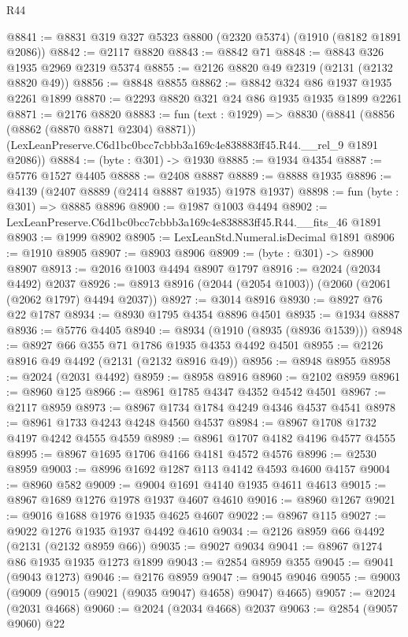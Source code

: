 \begin{lexlean}{R44}
\begin{coremodule}
@8841 := @8831 @319 @327 @5323 @8800 (@2320 @5374) (@1910 (@8182 @1891 @2086))
@8842 := @2117 @8820
@8843 := @8842 @71
@8848 := @8843 @326 @1935 @2969 @2319 @5374
@8855 := @2126 @8820 @49 @2319 (@2131 (@2132 @8820 @49))
@8856 := @8848 @8855
@8862 := @8842 @324 @86 @1937 @1935 @2261 @1899
@8870 := @2293 @8820 @321 @24 @86 @1935 @1935 @1899 @2261
@8871 := @2176 @8820
@8883 := fun (text : @1929) =>
  @8830
    (@8841
      (@8856 (@8862 (@8870 @8871 @2304) @8871))
      (LexLeanPreserve.C6d1bc0bcc7cbbb3a169c4e838883ff45.R44.__rel_9 @1891 @2086))
@8884 := (byte : @301) -> @1930
@8885 := @1934 @4354
@8887 := @5776 @1527 @4405
@8888 := @2408 @8887
@8889 := @8888 @1935
@8896 := @4139 (@2407 @8889 (@2414 @8887 @1935) @1978 @1937)
@8898 := fun (byte : @301) => @8885 @8896
@8900 := @1987 @1003 @4494
@8902 := LexLeanPreserve.C6d1bc0bcc7cbbb3a169c4e838883ff45.R44.__fits_46 @1891
@8903 := @1999 @8902
@8905 := LexLeanStd.Numeral.isDecimal @1891
@8906 := @1910 @8905
@8907 := @8903 @8906
@8909 := (byte : @301) -> @8900 @8907
@8913 := @2016 @1003 @4494 @8907 @1797
@8916 := @2024 (@2034 @4492) @2037
@8926 := @8913 @8916 (@2044 (@2054 @1003)) (@2060 (@2061 (@2062 @1797) @4494 @2037))
@8927 := @3014 @8916
@8930 := @8927 @76 @22 @1787
@8934 := @8930 @1795 @4354 @8896 @4501
@8935 := @1934 @8887
@8936 := @5776 @4405
@8940 := @8934 (@1910 (@8935 (@8936 @1539)))
@8948 := @8927 @66 @355 @71 @1786 @1935 @4353 @4492 @4501
@8955 := @2126 @8916 @49 @4492 (@2131 (@2132 @8916 @49))
@8956 := @8948 @8955
@8958 := @2024 (@2031 @4492)
@8959 := @8958 @8916
@8960 := @2102 @8959
@8961 := @8960 @125
@8966 := @8961 @1785 @4347 @4352 @4542 @4501
@8967 := @2117 @8959
@8973 := @8967 @1734 @1784 @4249 @4346 @4537 @4541
@8978 := @8961 @1733 @4243 @4248 @4560 @4537
@8984 := @8967 @1708 @1732 @4197 @4242 @4555 @4559
@8989 := @8961 @1707 @4182 @4196 @4577 @4555
@8995 := @8967 @1695 @1706 @4166 @4181 @4572 @4576
@8996 := @2530 @8959
@9003 := @8996 @1692 @1287 @113 @4142 @4593 @4600 @4157
@9004 := @8960 @582
@9009 := @9004 @1691 @4140 @1935 @4611 @4613
@9015 := @8967 @1689 @1276 @1978 @1937 @4607 @4610
@9016 := @8960 @1267
@9021 := @9016 @1688 @1976 @1935 @4625 @4607
@9022 := @8967 @115
@9027 := @9022 @1276 @1935 @1937 @4492 @4610
@9034 := @2126 @8959 @66 @4492 (@2131 (@2132 @8959 @66))
@9035 := @9027 @9034
@9041 := @8967 @1274 @86 @1935 @1935 @1273 @1899
@9043 := @2854 @8959 @355
@9045 := @9041 (@9043 @1273)
@9046 := @2176 @8959
@9047 := @9045 @9046
@9055 := @9003 (@9009 (@9015 (@9021 (@9035 @9047) @4658) @9047) @4665)
@9057 := @2024 (@2031 @4668)
@9060 := @2024 (@2034 @4668) @2037
@9063 := @2854 (@9057 @9060) @22

\end{coremodule}
\end{lexlean}
